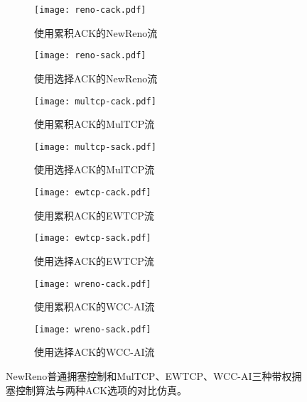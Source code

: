 \documentclass[winfonts]{njuthesis}
\begin{document}
\begin{figure}[ht!]
	\begin{subfigure}{.5\textwidth}
    \centering
		\texttt{[image: reno-cack.pdf]}
    \label{fig:renoCack}
    \caption{使用累积ACK的NewReno流}
  \end{subfigure}
	\begin{subfigure}{.5\textwidth}
    \centering
		\texttt{[image: reno-sack.pdf]}
    \label{fig:renoSack}
    \caption{使用选择ACK的NewReno流}
  \end{subfigure}
	\begin{subfigure}{.5\textwidth}
    \centering
		\texttt{[image: multcp-cack.pdf]}
    \label{fig:multcpCack}
    \caption{使用累积ACK的MulTCP流}
  \end{subfigure}
	\begin{subfigure}{.5\textwidth}
    \centering
		\texttt{[image: multcp-sack.pdf]}
    \label{fig:multcpSack}
    \caption{使用选择ACK的MulTCP流}
  \end{subfigure}
	\begin{subfigure}{.5\textwidth}
    \centering
		\texttt{[image: ewtcp-cack.pdf]}
    \label{fig:ewtcpCack}
    \caption{使用累积ACK的EWTCP流}
  \end{subfigure}
	\begin{subfigure}{.5\textwidth}
    \centering
		\texttt{[image: ewtcp-sack.pdf]}
    \label{fig:ewtcpSack}
    \caption{使用选择ACK的EWTCP流}
  \end{subfigure}
	\begin{subfigure}{.5\textwidth}
    \centering
		\texttt{[image: wreno-cack.pdf]}
    \label{fig:wrenoCack}
    \caption{使用累积ACK的WCC-AI流}
  \end{subfigure}
	\begin{subfigure}{.5\textwidth}
    \centering
		\texttt{[image: wreno-sack.pdf]}
    \label{fig:wrenoSack}
    \caption{使用选择ACK的WCC-AI流}
  \end{subfigure}
	\caption{NewReno普通拥塞控制和MulTCP、EWTCP、WCC-AI三种带权拥塞控制算法与两种ACK选项的对比仿真。}
	\label{fig:CackSackDiff}
\end{figure}
\end{document}
